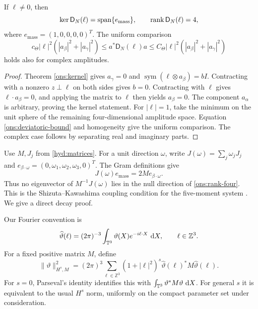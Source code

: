 \begin{proposition}\label{ons:rank-one}
 If $\ell\ne0$, then
 \begin{equation}\label{ons:rank-four}
 \operatorname{ker}\mathsf D_N(\ell)=\operatorname{span}\{e_{\mathrm{mass}}\},\qquad
 \operatorname{rank}\mathsf D_N(\ell)=4,
 \end{equation}
 where $e_{\mathrm{mass}}=(1,0,0,0,0)^T$.
 The uniform comparison
 \begin{equation}\label{ons:directional-bound}
 c_\Theta|\ell|^2(|a_\beta|^2+|a_\gamma|^2)
 \le a^*\mathsf D_N(\ell)a
 \le C_\Theta|\ell|^2(|a_\beta|^2+|a_\gamma|^2)
 \end{equation}
 holds also for complex amplitudes.
\end{proposition}
\begin{proof}
 Theorem \ref{ons:kernel} gives $a_\gamma=0$ and
 $\operatorname{sym}(\ell\otimes a_\beta)=bI$.
 Contracting with a nonzero $z\perp\ell$ on both sides gives $b=0$.
 Contracting with $\ell$ gives $\ell\cdot a_\beta=0$, and applying
 the matrix to $\ell$ then yields $a_\beta=0$.
 The component $a_\alpha$ is arbitrary, proving the kernel statement.
 For $|\ell|=1$, take the minimum on the unit sphere of the remaining
 four-dimensional amplitude space. Equation \eqref{ons:deviatoric-bound}
 and homogeneity give the uniform comparison.
 The complex case follows by separating real and imaginary parts.
\end{proof}

Use $M,J_j$ from \eqref{hyd:matrices}. For a unit direction $\omega$, write
$J(\omega)=\sum_j\omega_jJ_j$ and
$e_{\beta\cdot\omega}=(0,\omega_1,\omega_2,\omega_3,0)^T$.
The Gram definitions give
\begin{equation}\label{ons:euler-coupling}
 J(\omega)e_{\mathrm{mass}}=2M e_{\beta\cdot\omega}.
\end{equation}
Thus no eigenvector of $M^{-1}J(\omega)$ lies in the null direction
of \eqref{ons:rank-four}. This is the Shizuta--Kawashima coupling
condition for the five-moment system \cite[Theorem 1.1]{SK1985}.
We give a direct decay proof.

Our Fourier convention is
\[
 \widehat\vartheta(\ell)=(2\pi)^{-3}
       \int_{\mathbb T^3}\vartheta(X)e^{-i\ell\cdot X}\,\,\mathrm d X,
       \qquad \ell\in\mathbb Z^3.
\]
For a fixed positive matrix $M$, define
\[
 \|\vartheta\|_{H^s,M}^2
   =(2\pi)^3\sum_{\ell\in\mathbb Z^3}
      (1+|\ell|^2)^s\widehat\vartheta(\ell)^*M\widehat\vartheta(\ell).
\]
For $s=0$, Parseval's identity identifies this with
$\int_{\mathbb T^3}\vartheta^*M\vartheta\,\,\mathrm d X$.
For general $s$ it is equivalent to the usual $H^s$ norm, uniformly
on the compact parameter set under consideration.

